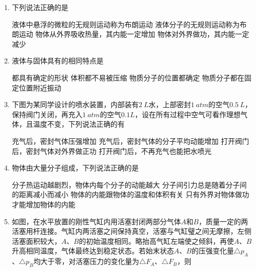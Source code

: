 

\begin{enumerate}[leftmargin=0em]
\renewcommand{\labelenumi}{\arabic{enumi}.}
\item
{}
下列说法正确的是  

\fourchoices
{液体中悬浮的微粒的无规则运动称为布朗运动}
{液体分子的无规则运动称为布朗运动}
{物体从外界吸收热量，其内能一定增加}
{物体对外界做功，其内能一定减少}


\item 
{}
液体与固体具有的相同特点是  


\fourchoices
{都具有确定的形状}
{体积都不易被压缩}
{物质分子的位置都确定}
{物质分子都在固定位置附近振动}


\item 
{}
下图为某同学设计的喷水装置，内部装有$ 2\ L $水，上部密封$ 1\ atm $的空气$ 0.5\ L $，保持阀门关闭，再充入$ 1\ atm $的空气$ 0.1L $，设在所有过程中空气可看作理想气体，且温度不变，下列说法正确的有  
\begin{figure}[h!]
\centering

\end{figure}

\fourchoices
{充气后，密封气体压强增加}
{充气后，密封气体的分子平均动能增加}
{打开阀门后，密封气体对外界做正功}
{打开阀门后，不再充气也能把水喷光}



\item 
{}
物体由大量分子组成，下列说法正确的是  

\fourchoices
{分子热运动越剧烈，物体内每个分子的动能越大}
{分子间引力总是随着分子间的距离减小而减小}
{物体的内能跟物体的温度和体积有关}
{只有外界对物体做功才能增加物体的内能}


\item 
{}
如图，在水平放置的刚性气缸内用活塞封闭两部分气体$ A $和$ B $，质量一定的两活塞用杆连接。气缸内两活塞之间保持真空，活塞与气缸璧之间无摩擦，左侧活塞面积较大，$ A $、$ B $的初始温度相同。略抬高气缸左端使之倾斜，再使$ A $、$ B $升高相同温度，气体最终达到稳定状态。若始末状态$ A $、$ B $的压强变化量$ \triangle p_A $、$ \triangle p_B $均大于零，对活塞压力的变化量为$ \triangle F_A $、$ \triangle F_B $，则  
\begin{figure}[h!]
\centering

\end{figure}



\end{enumerate}
